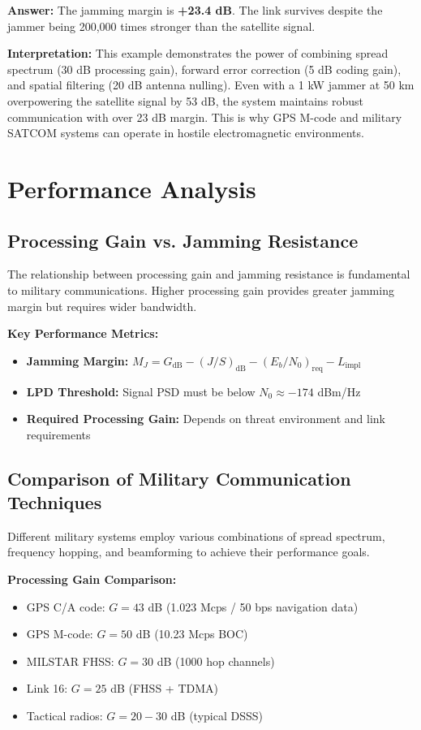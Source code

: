 \textbf{Answer:} The jamming margin is \textbf{+23.4 dB}. The link survives despite the jammer being 200,000 times stronger than the satellite signal.

\textbf{Interpretation:} This example demonstrates the power of combining spread spectrum (30 dB processing gain), forward error correction (5 dB coding gain), and spatial filtering (20 dB antenna nulling). Even with a 1 kW jammer at 50 km overpowering the satellite signal by 53 dB, the system maintains robust communication with over 23 dB margin. This is why GPS M-code and military SATCOM systems can operate in hostile electromagnetic environments.

\section{Performance Analysis}

\subsection{Processing Gain vs. Jamming Resistance}

The relationship between processing gain and jamming resistance is fundamental to military communications. Higher processing gain provides greater jamming margin but requires wider bandwidth.

\textbf{Key Performance Metrics:}

\begin{itemize}
\item \textbf{Jamming Margin:} $M_J = G_{\text{dB}} - (J/S)_{\text{dB}} - (E_b/N_0)_{\text{req}} - L_{\text{impl}}$
\item \textbf{LPD Threshold:} Signal PSD must be below $N_0 \approx -174$ dBm/Hz
\item \textbf{Required Processing Gain:} Depends on threat environment and link requirements
\end{itemize}

\subsection{Comparison of Military Communication Techniques}

Different military systems employ various combinations of spread spectrum, frequency hopping, and beamforming to achieve their performance goals.

\textbf{Processing Gain Comparison:}
\begin{itemize}
\item GPS C/A code: $G = 43$ dB (1.023 Mcps / 50 bps navigation data)
\item GPS M-code: $G = 50$ dB (10.23 Mcps BOC)
\item MILSTAR FHSS: $G = 30$ dB (1000 hop channels)
\item Link 16: $G = 25$ dB (FHSS + TDMA)
\item Tactical radios: $G = 20-30$ dB (typical DSSS)
\end{itemize}

